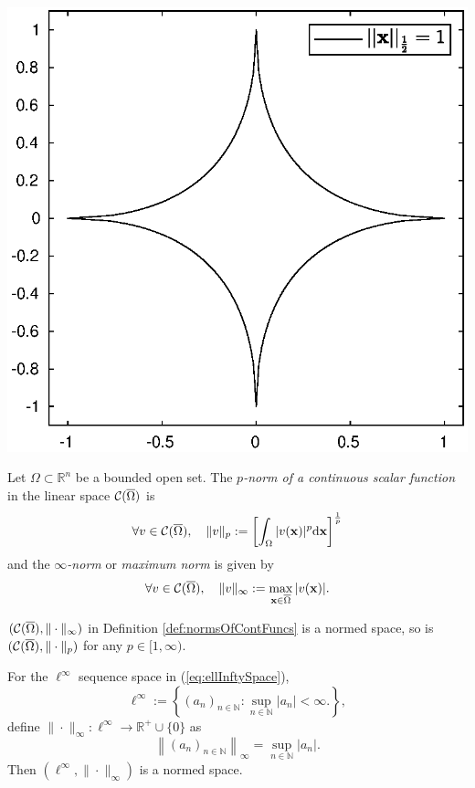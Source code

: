 \begin{Figure}
  \centering
  \includegraphics[width=0.6\linewidth]{eps/UnitBallNorm05}
  \label{fig:notANormIfpLessThan1}
\end{Figure}

\begin{defn}
  \label{def:normsOfContFuncs}
  Let $\Omega\subset \mathbb{R}^n$ be a bounded open set.
  The \emph{$p$-norm of a continuous scalar function} in the linear space
  ${\cal C}(\overline{\Omega})$
  is 
  \begin{equation}
    \label{eq:pNormOfContFuncs}
    \forall v\in {\cal C}(\overline{\Omega}),\quad
    \|v\|_p :=  \left[\int_{\Omega}|v(\mathbf{x})|^p
      \mathrm{d} \mathbf{x}\right]^{\frac{1}{p}}
  \end{equation}
  and the \emph{$\infty$-norm} or \emph{maximum norm}
  is given by 
  \begin{equation}
    \label{eq:maxNormOfContFuncs}
    \forall v\in {\cal C}(\overline{\Omega}),\quad
    \|v\|_{\infty} :=  \max_{\mathbf{x}\in \overline{\Omega}}
    |v(\mathbf{x})|.
  \end{equation}
\end{defn}

\begin{exm}
  $({\cal C}(\overline{\Omega}), \|\cdot\|_{\infty})$
  in Definition \ref{def:normsOfContFuncs} 
  is a normed space,
  so is $({\cal C}(\overline{\Omega}), \|\cdot\|_{p})$
  for any $p\in [1,\infty)$.
\end{exm}

\begin{exm}
  For the $\ell^{\infty}$ sequence space in (\ref{eq:ellInftySpace}), 
  \begin{displaymath}
    \ell^{\infty} := \left\{
      (a_n)_{n\in \mathbb{N}}: \sup_{n\in \mathbb{N}}|a_n| < \infty.
    \right\},
  \end{displaymath}
  define $\|\cdot\|_{\infty}: \ell^{\infty}\rightarrow \mathbb{R}^+\cup\{0\}$ as
  \begin{equation}
    \label{eq:ellInftyNorm}
    \left\|(a_n)_{n\in \mathbb{N}}\right\|_{\infty}
    = \sup_{n\in \mathbb{N}} |a_n|.
  \end{equation}
  Then $(\ell^{\infty}, \|\cdot\|_{\infty})$
  is a normed space.
\end{exm}

